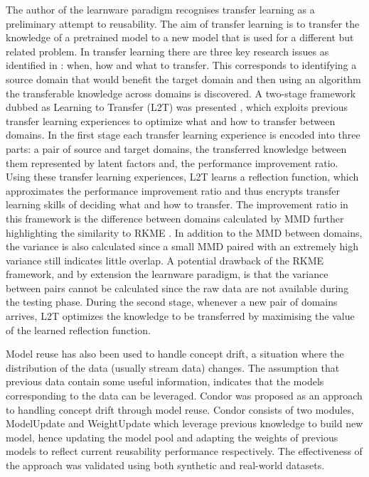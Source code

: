 \documentclass{mpaper}
\begin{document}
The author of the learnware paradigm \cite{Learnware} recognises transfer learning as a preliminary attempt to reusability. The aim of transfer learning is to transfer the knowledge of a pretrained model to a new model that is used for a different but related problem. In transfer learning there are three key research issues as identified in \cite{DefinitionTL}: when, how and what to transfer. This corresponds to identifying a source domain that would benefit the target domain and then using an algorithm the transferable knowledge across domains is discovered. A two-stage framework dubbed as Learning to Transfer (L2T) was presented \cite{L2T}, which exploits previous transfer learning experiences to optimize what and how to transfer between domains. In the first stage each transfer learning experience is encoded into three parts: a pair of source and target domains, the transferred knowledge between them represented by latent factors and, the performance improvement ratio. Using these transfer learning experiences, L2T learns a reflection function, which approximates the performance improvement ratio and thus encrypts transfer learning skills of deciding what and how to transfer. The improvement ratio in this framework is the difference between domains calculated by MMD further highlighting the similarity to RKME \cite{KernelMMD}. In addition to the MMD between domains, the variance is also calculated since a small MMD paired with an extremely high variance still indicates little overlap. A potential drawback of the RKME \cite{KernelMMD} framework, and by extension the learnware paradigm, is that the variance between pairs cannot be calculated since the raw data are not available during the testing phase. During the second stage, whenever a new pair of domains arrives, L2T optimizes the knowledge to be transferred by maximising the value of the learned reflection function.

Model reuse has also been used to handle concept drift, a situation where the distribution of the data (usually stream data) changes. The assumption that previous data contain some useful information, indicates that the models corresponding to the data can be leveraged. Condor was proposed \cite{ConceptDrift} as an approach to handling concept drift through model reuse. Condor consists of two modules, ModelUpdate and WeightUpdate which leverage previous knowledge to build new model, hence updating the model pool and adapting the weights of previous models to reflect current reusability performance respectively. The effectiveness of the approach was validated using both synthetic and real-world datasets. 
\end{document}
